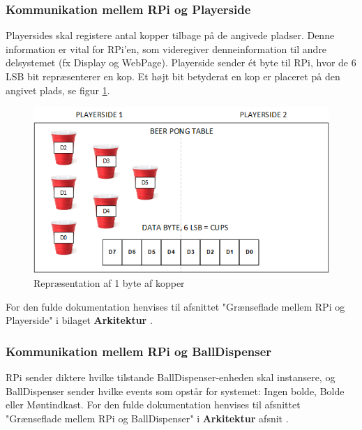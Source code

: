 \documentclass[Rapport/Rapport_main.tex]{subfiles}
\begin{document}
\subsubsection{Kommunikation mellem RPi og Playerside}
Playersides skal registere antal kopper tilbage på de angivede pladser. Denne information er vital for RPi’en, som videregiver denneinformation til andre delsystemet (fx Display og WebPage). Playerside sender ét byte til RPi, hvor de 6 LSB bit repræsenterer en kop. Et højt bit betyderat en kop er placeret på den angivet plads, se figur \ref{fig:cups_setup}.
\begin{figure}[H]
    \centering
    \includegraphics[width=\textwidth]{Arkitektur/Grenseflader/Graphics/cups.png}
    \caption{Repræsentation af 1 byte af kopper}
    \label{fig:cups_setup}
\end{figure}
For den fulde dokumentation henvises til afsnittet "Grænseflade mellem RPi og Playerside" i bilaget \textbf{Arkitektur} .
\subsubsection{Kommunikation mellem RPi og BallDispenser}
RPi sender diktere hvilke tilstande BallDispenser-enheden skal instansere, og BallDispenser sender hvilke events som opstår for systemet: Ingen bolde, Bolde eller Møntindkast. For den fulde dokumentation henvises til afsnittet "Grænseflade mellem RPi og BallDispenser" i \textbf{Arkitektur} afsnit .
\end{document}
